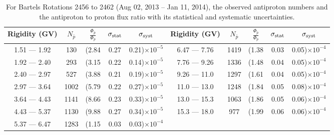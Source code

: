 \begin{table}[p] 
\renewcommand\baselinestretch{1.3}\selectfont
\setlength\tabcolsep{3pt}
\centering
\begin{tabular}{ccccc | ccccc}
\hline
\textbf{Rigidity}  (GV)  & $N_{\bar{p}}$ & $\frac{\Phi_{\bar{p}}}{\Phi_{p}}$ & $\sigma_{\rm{stat}}$ & $\sigma_{\rm{syst}}$ \hspace{1cm}   & \textbf{Rigidity}  (GV)  & $N_{\bar{p}}$ & $\frac{\Phi_{\bar{p}}}{\Phi_{p}}$ & $\sigma_{\rm{stat}}$ & $\sigma_{\rm{syst}}$ \hspace{1cm} \\ 
\hline
1.51 — 1.92   &  130                &(2.84                          &  0.27              &      0.21)$\times 10^{-5}$  & 6.47 — 7.76                &  1419                    &(1.38                                &  0.03                   &      0.05)$\times 10^{-4}$\\
1.92 — 2.40   &  293                &(3.15                          &  0.22              &      0.14)$\times 10^{-5}$  & 7.76 — 9.26                &  1336                    &(1.48                                &  0.04                   &      0.05)$\times 10^{-4}$\\
2.40 — 2.97   &  527                &(3.88                          &  0.21              &      0.19)$\times 10^{-5}$  & 9.26 — 11.0                &  1297                    &(1.61                                &  0.04                   &      0.05)$\times 10^{-4}$\\    
2.97 — 3.64   &  1002              &(5.79                          &  0.22              &      0.27)$\times 10^{-5}$  & 11.0 — 13.0                 &  1248                    &(1.84                                & 0.05                   &      0.08)$\times 10^{-4}$\\    
3.64 — 4.43   &  1141              &(8.66                          &  0.23              &      0.33)$\times 10^{-5}$  & 13.0 — 15.3               &  1063                    &(1.86                                &  0.05                   &      0.06)$\times 10^{-4}$\\
4.43 — 5.37   &  1130              &(9.88                          &  0.27              &      0.34)$\times 10^{-5}$  & 15.3 — 18.0               &  977                      &(1.99                                &  0.06                   &      0.06)$\times 10^{-4}$\\
5.37 — 6.47   &  1283             &(1.15                           &  0.03              &      0.03)$\times 10^{-4}$  & \\
\hline
\end{tabular}
\caption[Antiproton to proton flux ratio for Bartels Rotations 2456 to 2462]{For Bartels Rotations 2456 to 2462 (Aug 02, 2013 – Jan 11, 2014), the observed antiproton numbers and the antiproton to proton flux ratio with its statistical and systematic uncertainties.}
\label{TableOfDependent6}
\end{table}

